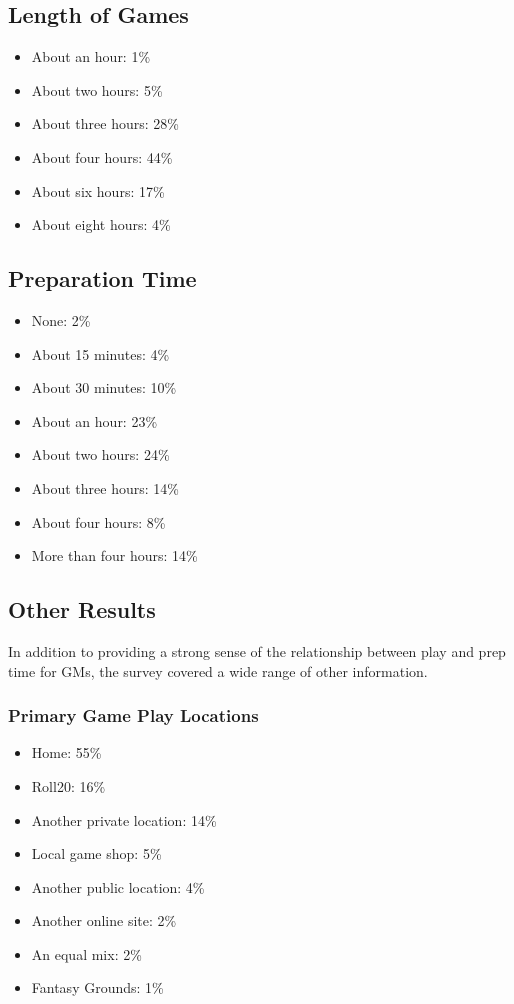 \documentclass[10pt,a4paper,twoside,bg=print,twocolumn,openany,nodeprecatedcode]{dndbook}
\begin{document}
\subsection{Length of Games}

\begin{itemize}
\item About an hour: 1\%
\item About two hours: 5\%
\item About three hours: 28\%
\item About four hours: 44\%
\item About six hours: 17\%
\item About eight hours: 4\%
\end{itemize}

\subsection{Preparation Time}

\begin{itemize}
\item None: 2\%
\item About 15 minutes: 4\%
\item About 30 minutes: 10\%
\item About an hour: 23\%
\item About two hours: 24\%
\item About three hours: 14\%
\item About four hours: 8\%
\item More than four hours: 14\%
\end{itemize}

\subsection{Other Results}
In addition to providing a strong sense of the relationship between play and prep time for GMs, the survey covered a wide range of other information.
\subsubsection{Primary Game Play Locations}

\begin{itemize}
\item Home: 55\%
\item Roll20: 16\%
\item Another private location: 14\%
\item Local game shop: 5\%
\item Another public location: 4\%
\item Another online site: 2\%
\item An equal mix: 2\%
\item Fantasy Grounds: 1\%
\end{itemize}
\end{document}
